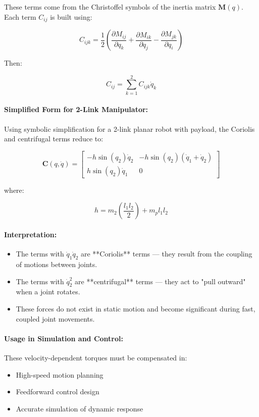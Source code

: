 \documentclass[a4paper,12pt]{article}
\begin{document}
These terms come from the Christoffel symbols of the inertia matrix $\mathbf{M}(q)$. Each term \( C_{ij} \) is built using:

\[
C_{ijk} = \frac{1}{2} \left( \frac{\partial M_{ij}}{\partial q_k} + \frac{\partial M_{ik}}{\partial q_j} - \frac{\partial M_{jk}}{\partial q_i} \right)
\]

Then:

\[
C_{ij} = \sum_{k=1}^{2} C_{ijk} \dot{q}_k
\]

\paragraph{Simplified Form for 2-Link Manipulator:}

Using symbolic simplification for a 2-link planar robot with payload, the Coriolis and centrifugal terms reduce to:

\[
\mathbf{C}(q, \dot{q}) =
\begin{bmatrix}
-h \sin(q_2) \dot{q}_2 & -h \sin(q_2)(\dot{q}_1 + \dot{q}_2) \\
h \sin(q_2) \dot{q}_1 & 0
\end{bmatrix}
\]

\noindent where:

\[
h = m_2 \left( \frac{l_1 l_2}{2} \right) + m_p l_1 l_2
\]

\paragraph{Interpretation:}
\begin{itemize}
    \item The terms with $\dot{q}_1 \dot{q}_2$ are **Coriolis** terms — they result from the coupling of motions between joints.
    \item The terms with $\dot{q}_2^2$ are **centrifugal** terms — they act to "pull outward" when a joint rotates.
    \item These forces do not exist in static motion and become significant during fast, coupled joint movements.
\end{itemize}
  
\paragraph{Usage in Simulation and Control:}

These velocity-dependent torques must be compensated in:
\begin{itemize}
    \item High-speed motion planning
    \item Feedforward control design
    \item Accurate simulation of dynamic response
\end{itemize}
\end{document}
